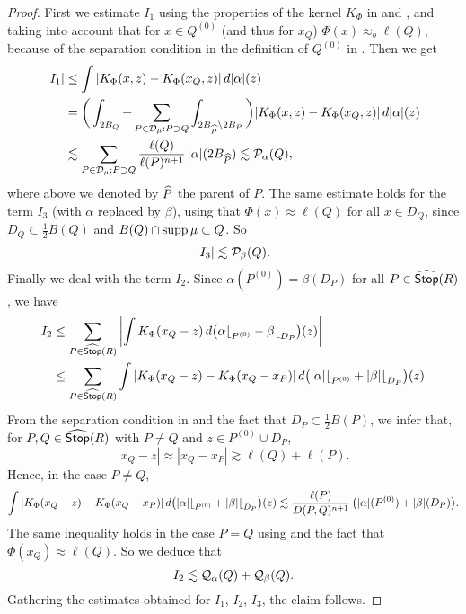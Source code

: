 \begin{proof}
First we estimate $I_1$ using the properties of the kernel $K_\Phi$ in 
and , and taking into account that for $x\in Q^{(0)}$ (and thus for $x_Q$)
$\Phi(x)\approx_b \ell(Q)$, because of the separation condition in the definition of
$Q^{(0)}$ in . Then we get
\begin{align*}
|I_1| &\leq \int |K_\Phi(x,z) -  K_\Phi(x_Q,z)|\,d|\alpha|(z)\\
& = \bigg(\int_{2B_Q} +
\sum_{P\in{\mathcal D}_\mu:P\supset Q} \int_{2B_{{\widehat{P}}}\setminus 2B_P}\bigg) |K_\Phi(x,z) -  K_\Phi(x_Q,z)|\,d|\alpha|(z)\\
&\lesssim \sum_{P\in{\mathcal D}_\mu:P\supset Q} \frac{\ell(Q)}{\ell(P)^{n+1}} \,|\alpha|(2B_{{\widehat{P}}}) \lesssim {\mathcal P}_\alpha(Q),
\end{align*}
where above we denoted by ${\widehat{P}}$ the parent of $P$.
The same estimate holds for the term $I_3$ (with $\alpha$ replaced by $\beta$), using that $\Phi(x)\approx \ell(Q)$ for all $x\in D_Q$,
since $D_Q\subset\frac12B(Q)$ and $B(Q)\cap\operatorname{supp}\mu\subset Q$. So
$$|I_3| \lesssim {\mathcal P}_\beta(Q).$$
Finally we deal with the term $I_2$.
Since $\alpha(P^{(0)})=\beta(D_P)$ for all $P\in{\widehat{{\mathsf {Stop}}}}(R)$, we have
\begin{align*}
I_2 & \leq \sum_{P\in{\widehat{{\mathsf {Stop}}}}(R)} \left| \int K_\Phi(x_Q-z)\,d\big(\alpha{\lfloor}_{P^{(0)}} - 
\beta{\lfloor}_{D_P} \big)(z)\right|\\
& \leq \sum_{P\in{\widehat{{\mathsf {Stop}}}}(R)}  \int |K_\Phi(x_Q-z)-K_\Phi(x_Q-x_P)|\,d\big(|\alpha|{\lfloor}_{P^{(0)}} + 
|\beta|{\lfloor}_{D_P} \big)(z)
\end{align*}
From the separation condition in  and the fact that $D_P\subset\frac12B(P)$, we infer that, for $P,Q\in{\widehat{{\mathsf {Stop}}}}(R)$ with $P\neq Q$ and $z\in P^{(0)}\cup D_P$,
$$|x_Q-z|\approx |x_Q - x_P|\gtrsim \ell(Q) + \ell(P).$$
Hence, in the case $P\neq Q$,
$$\int |K_\Phi(x_Q-z)-K_\Phi(x_Q-x_P)|\,d\big(|\alpha|{\lfloor}_{P^{(0)}} + 
|\beta|{\lfloor}_{D_P} \big)(z)\lesssim \frac{\ell(P)}{D(P,Q)^{n+1}}\,\big(|\alpha|(P^{(0)}) + |\beta|(D_P)\big).$$
The same inequality holds in the case $P=Q$ using  and the fact that $\Phi(x_Q) 
\approx\ell(Q)$.
So we deduce that
$$I_2\lesssim {\mathcal Q}_\alpha(Q) + {\mathcal Q}_\beta(Q).$$
Gathering the estimates obtained for $I_1$, $I_2$, $I_3$, the claim  follows.


\end{proof}
